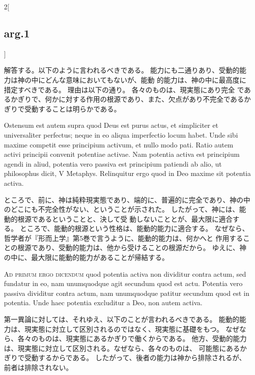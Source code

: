 \documentclass[paper=a4paper,fontsize=10pt,jafontsize=9pt,titlepage]{jlreq}
\begin{document}
\begin{paracol}{2}[\subsection{arg.1}]
\switchcolumn

解答する。以下のように言われるべきである。
能力にも二通りあり、受動的能力は神の中にどんな意味においてもないが、能動
 的能力は、神の中に最高度に措定すべきである。
理由は以下の通り。
各々のものは、現実態にあり完全
 であるかぎりで、何かに対する作用の根源であり、また、欠点があり不完全であるかぎりで受動することは明らかである。

\switchcolumn*

Ostensum est autem supra quod Deus est purus actus, et
simpliciter et universaliter perfectus; neque in eo aliqua imperfectio
locum habet. Unde sibi maxime competit esse principium activum, et nullo
modo pati. Ratio autem activi principii convenit potentiae activae. Nam
potentia activa est principium agendi in aliud, potentia vero passiva
est principium patiendi ab alio, ut philosophus dicit, V
Metaphys. Relinquitur ergo quod in Deo maxime sit potentia activa.

\switchcolumn

ところで、前に、神は純粋現実態であり、端的に、普遍的に完全であり、神の中
 のどこにも不完全性がない、ということが示された。
したがって、神には、能動的根源であるということと、決して受
 動しないこととが、最大限に適合する。
ところで、能動的根源という性格は、能動的能力に適合する。
なぜなら、哲学者が『形而上学』第5巻で言うように、能動的能力は、何かへと
 作用することの根源であり、受動的能力は、他から受けることの根源だから。
ゆえに、神の中に、最大限に能動的能力があることが帰結する。

\switchcolumn*[\subsection{ad.1}]

{\scshape Ad primum ergo dicendum} quod potentia activa
non dividitur contra actum, sed fundatur in eo, nam unumquodque agit
secundum quod est actu. Potentia vero passiva dividitur contra actum,
nam unumquodque patitur secundum quod est in potentia. Unde haec
potentia excluditur a Deo, non autem activa.

\switchcolumn

第一異論に対しては、それゆえ、以下のことが言われるべきである。
能動的能力は、現実態に対立して区別されるのではなく、現実態に基礎をもつ。
 なぜなら、各々のものは、現実態にあるかぎりで働くからである。
他方、受動的能力は、現実態に対立して区別される。なぜなら、各々のものは、
 可能態にあるかぎりで受動するからである。
したがって、後者の能力は神から排除されるが、前者は排除されない。


\end{paracol}
\end{document}
